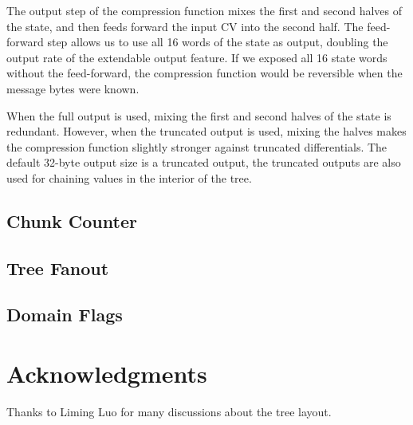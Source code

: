 \documentclass[11pt,notitlepage,a4paper]{article}
\begin{document}
The output step of the compression function mixes the first and second halves
of the state, and then feeds forward the input CV into the second half. The
feed-forward step allows us to use all 16 words of the state as output,
doubling the output rate of the extendable output feature. If we exposed all 16
state words without the feed-forward, the compression function would be
reversible when the message bytes were known.

When the full output is used, mixing the first and second halves of the state
is redundant. However, when the truncated output is used, mixing the halves
makes the compression function slightly stronger against truncated
differentials. The default 32-byte output size is a truncated output, the
truncated outputs are also used for chaining values in the interior of the
tree.

\subsection{Chunk Counter}\label{sec:chunkcounter}

\subsection{Tree Fanout}\label{sec:treefanout}

\subsection{Domain Flags}\label{sec:domainflags}

\section*{Acknowledgments}\label{sec:acknowledgments}

Thanks to Liming Luo for many discussions about the tree layout.




\end{document}
